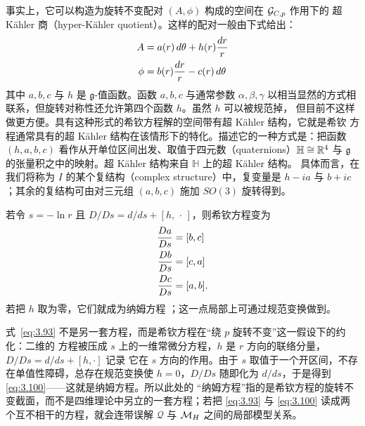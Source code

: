 事实上，它可以构造为旋转不变配对 $(A,\phi)$ 构成的空间在 $\mathcal{G}_{C,p}$ 作用下的
超 Kähler 商（hyper-Kähler quotient）。这样的配对一般由下式给出：
\setcounter{equation}{91}
\begin{equation}\label{eq:3.92}
  \begin{aligned}A & = a(r)\,d\theta+h(r){dr\over r}
\\\phi &= b(r){dr\over r}-c(r)\,d\theta\end{aligned}
\end{equation}
其中 $a,b,c$ 与 $h$ 是 $\mathfrak g$-值函数。函数 $a,b,c$ 与通常参数 $\alpha,\beta,\gamma$
以相当显然的方式相联系，但旋转对称性还允许第四个函数 $h$。虽然 $h$ 可以被规范掉，
但目前不这样做更方便。具有这种形式的希钦方程解的空间带有超 Kähler 结构，它就是希钦
方程通常具有的超 Kähler 结构在该情形下的特化。描述它的一种方式是：把函数
$(h,a,b,c)$ 看作从开单位区间出发、取值于四元数（quaternions）$\mathbb{H}\cong{\mathbb{R}}^4$ 与
$\mathfrak g$ 的张量积之中的映射。超 Kähler 结构来自 $\mathbb{H}$ 上的超 Kähler 结构。
具体而言，在我们将称为 $I$ 的某个复结构（complex structure）中，复变量是 $h-ia$
与 $b+ic$；其余的复结构可由对三元组 $(a,b,c)$ 施加 $SO(3)$ 旋转得到。

若令 $s=-\ln r$ 且 $D/Ds=d/ds+[h,\,\cdot\,]$，则希钦方程变为
\setcounter{equation}{92}
\begin{equation}\label{eq:3.93}
  \begin{aligned}{Da\over Ds}& = [b,c] \\
                    {Db\over Ds}&=  [c,a] \\
                     {Dc\over Ds}&= [a,b]. \end{aligned}
\end{equation}
若把 $h$ 取为零，它们就成为纳姆方程 \cite{ref64}；这一点局部上可通过规范变换做到。

\begin{yizhu}[易错点]
式~\eqref{eq:3.93} 不是另一套方程，而是希钦方程在“绕 $p$ 旋转不变”这一假设下的约化：二维的
方程被压成 $s$ 上的一维常微分方程，$h$ 是 $r$ 方向的联络分量，$D/Ds=d/ds+[h,\cdot]$ 记录
它在 $s$ 方向的作用。由于 $s$ 取值于一个开区间，不存在单值性障碍，总存在规范变换使
$h=0$，$D/Ds$ 随即化为 $d/ds$，于是得到 \eqref{eq:3.100}——这就是纳姆方程。所以此处的
“纳姆方程”指的是希钦方程的旋转不变截面，而不是四维理论中另立的一套方程；若把
\eqref{eq:3.93} 与 \eqref{eq:3.100} 读成两个互不相干的方程，就会连带误解 ${\mathcal Q}$ 与
${{\mathcal{M}}_H}$ 之间的局部模型关系。
\end{yizhu}

